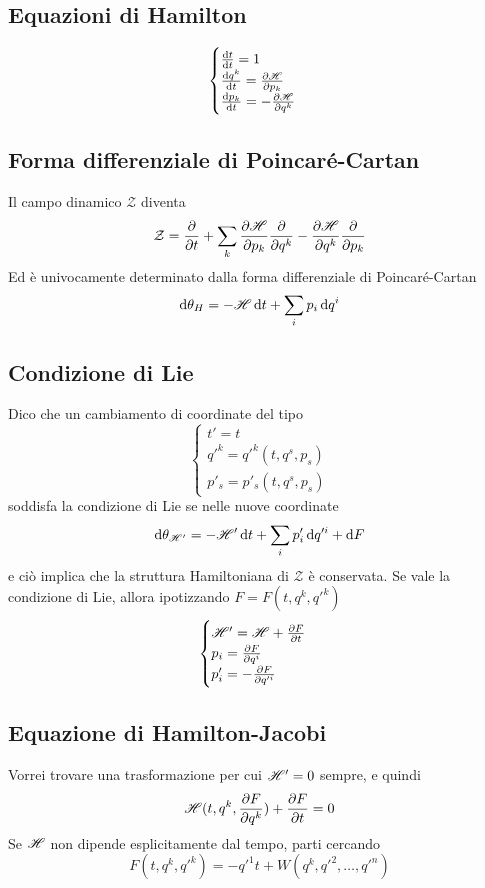 \documentclass[11pt,landscape,a4paper]{article}
\begin{document}
\begin{multicols}{3}
    \subsection{Equazioni di Hamilton}
        $$ \begin{cases}
            \ddt{t} = 1\\
            \ddt{q^k} = \de{\Ham}{p_k}\\
            \ddt{p_k} = - \de{\Ham}{q^k}
        \end{cases}$$
    \subsection{Forma differenziale di Poincaré-Cartan}
        Il campo dinamico $\mathcal{Z}$ diventa 
        $$ \mathcal{Z} = \frac{\partial }{\partial t} + \sum_k \frac{\partial \mathscr{H}}{\partial p_k} \frac{\partial }{\partial q^k} - \frac{\partial \mathscr{H}}{\partial q^k} \frac{\partial }{\partial p_k}$$
        Ed è univocamente determinato dalla forma differenziale di Poincaré-Cartan
        $$ \dif \theta_H = -\Ham \dif t + \sum_i p_i \dif q^i$$
    \subsection{Condizione di Lie}
        Dico che un cambiamento di coordinate del tipo 
        $$ \begin{cases}
            t' = t\\
            q'^k = q'^k (t, q^s, p_s)\\
            p'_s = p'_s(t, q^s, p_s)
        \end{cases}$$
        soddisfa la condizione di Lie se nelle nuove coordinate
        $$ \dif \theta_{\Ham'} = - \Ham' \dif t + \sum_i p'_i \dif q'^i + \dif F$$
        e ciò implica che la struttura Hamiltoniana di $\mathcal{Z}$ è conservata. 
        Se vale la condizione di Lie, allora ipotizzando $F = F(t, q^k, q'^k)$
        $$ \begin{cases}
            \mathscr{H}' = \mathscr{H} + \frac{\partial F}{\partial t}\\
            p_i = \frac{\partial F}{\partial q^i}\\
            p'_i = - \frac{\partial F}{\partial q'^i}
        \end{cases}$$
    \subsection{Equazione di Hamilton-Jacobi}
        Vorrei trovare una trasformazione per cui $\mathscr{H}' = 0$ sempre, e quindi
        $$ \mathscr{H}(t, q^k, \frac{\partial F}{\partial q^k}) + \frac{\partial F}{\partial t} = 0$$
        Se $\mathscr{H}$ non dipende esplicitamente dal tempo, parti cercando 
        $$ F(t, q^k, q'^k) = -q'^1 t + W(q^k,q'^2, \dots, q'^n)$$
\end{multicols}
\end{document}
